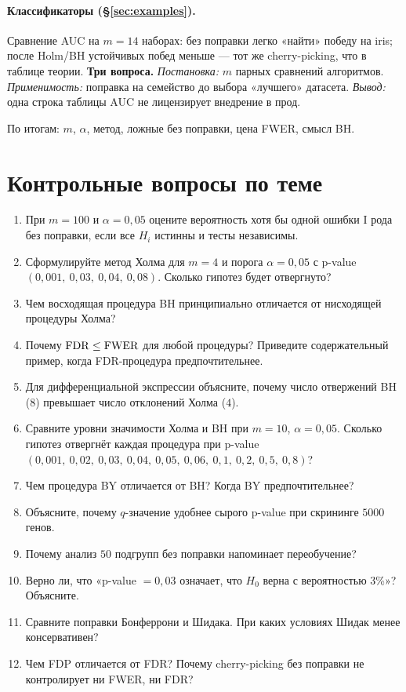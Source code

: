 \paragraph{Классификаторы (\S\ref{sec:examples}).}
Сравнение AUC на $m=14$ наборах: без поправки легко «найти» победу на iris; после Holm/BH устойчивых побед меньше --- тот же cherry-picking, что в таблице теории.
\medskip\noindent\textbf{Три вопроса.} \textit{Постановка:} $m$ парных сравнений алгоритмов. 
\textit{Применимость:} поправка на семейство до выбора «лучшего» датасета. 
\textit{Вывод:} одна строка таблицы AUC не лицензирует внедрение в прод.\medskip

По итогам: $m$, $\alpha$, метод, ложные без поправки, цена FWER, смысл BH.

\section{Контрольные вопросы по теме}

\begin{enumerate}
    \item При $m=100$ и $\alpha=0{,}05$ оцените вероятность хотя бы
          одной ошибки I рода без поправки, если все $H_i$ истинны и тесты независимы.
    \item Сформулируйте метод Холма для $m=4$ и порога $\alpha=0{,}05$
          с p-value $(0{,}001,\ 0{,}03,\ 0{,}04,\ 0{,}08)$.
          Сколько гипотез будет отвергнуто?
    \item Чем восходящая процедура BH принципиально отличается
          от нисходящей процедуры Холма?
    \item Почему $\operatorname{FDR}\leq\operatorname{FWER}$ для любой процедуры? Приведите
          содержательный пример, когда FDR-процедура предпочтительнее.
    \item Для дифференциальной экспрессии объясните, почему число
          отвержений BH ($8$) превышает число отклонений Холма ($4$).
    \item Сравните уровни значимости Холма и BH при $m=10$, $\alpha=0{,}05$.
          Сколько гипотез отвергнёт каждая процедура при p-value $(0{,}001,\ 0{,}02,\ 0{,}03,\ 0{,}04,\ 0{,}05,\ 0{,}06,\ 0{,}1,\ 0{,}2,\ 0{,}5,\ 0{,}8)$?
    \item Чем процедура BY отличается от BH? Когда BY предпочтительнее?
    \item Объясните, почему $q$-значение удобнее сырого p-value при
          скрининге $5000$ генов.
    \item Почему анализ $50$ подгрупп без поправки напоминает
          переобучение?
    \item Верно ли, что «p-value $=0{,}03$ означает, что $H_0$ верна с вероятностью 3\%»? Объясните.
    \item Сравните поправки Бонферрони и Шидака. При каких условиях Шидак менее консервативен?
    \item Чем FDP отличается от FDR? Почему cherry-picking без поправки не контролирует ни FWER, ни FDR?
\end{enumerate}
